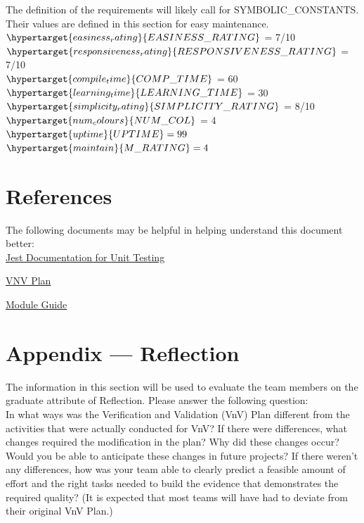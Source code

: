\documentclass[12pt, titlepage]{article}
\begin{document}
	The definition of the requirements will likely call for SYMBOLIC\_CONSTANTS.
	Their values are defined in this section for easy maintenance.\\
	
	\noindent $\hypertarget{easiness_rating}{EASINESS\_RATING}$ = 7/10 \\
	$\hypertarget{responsiveness_rating}{RESPONSIVENESS\_RATING}$ = 7/10 \\
	$\hypertarget{compile_time}{COMP\_TIME}$ = 60 \\
	$\hypertarget{learning_time}{LEARNING\_TIME}$  = 30\\
	$\hypertarget{simplicity_rating}{SIMPLICITY\_RATING}$ = 8/10\\
	$\hypertarget{num_colours}{NUM\_COL}$ = 4\\
	$\hypertarget{uptime}{UPTIME} = 99$\\
	$\hypertarget{maintain}{M\_RATING} = 4$\\
	
	\newpage{}
	
	\section{References}
	
	The following documents may be helpful in helping understand this document better:\\
	
	\href{https://jestjs.io/docs/getting-started}{Jest Documentation for Unit Testing}
	
	\href{https://github.com/RutheniumVI/UnderTree/blob/main/docs/VnVPlan/VnVPlan.pdf}{VNV Plan}
	
	\href{https://github.com/RutheniumVI/UnderTree/blob/main/docs/Design/MG/MG.pdf}{Module Guide}
	
	\section*{Appendix --- Reflection}
	
	The information in this section will be used to evaluate the team members on the
	graduate attribute of Reflection.  Please answer the following question: \\
	
		In what ways was the Verification and Validation (VnV) Plan different
		from the activities that were actually conducted for VnV?  If there were
		differences, what changes required the modification in the plan?  Why did
		these changes occur?  Would you be able to anticipate these changes in future
		projects?  If there weren't any differences, how was your team able to clearly
		predict a feasible amount of effort and the right tasks needed to build the
		evidence that demonstrates the required quality?  (It is expected that most
		teams will have had to deviate from their original VnV Plan.)
	
\end{document}
